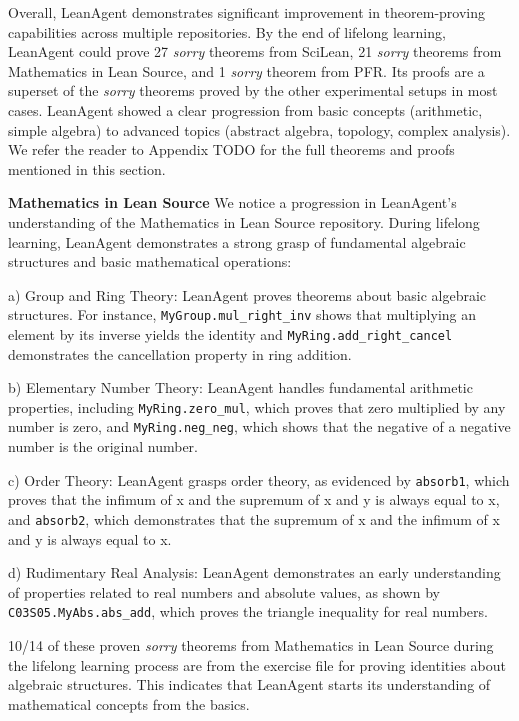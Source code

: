 \documentclass{article} %
\begin{document}
Overall, LeanAgent demonstrates significant improvement in theorem-proving capabilities across multiple repositories. By the end of lifelong learning, LeanAgent could prove 27 \textit{sorry} theorems from SciLean, 21 \textit{sorry} theorems from Mathematics in Lean Source, and 1 \textit{sorry} theorem from PFR. Its proofs are a superset of the \textit{sorry} theorems proved by the other experimental setups in most cases. LeanAgent showed a clear progression from basic concepts (arithmetic, simple algebra) to advanced topics (abstract algebra, topology, complex analysis). We refer the reader to Appendix TODO for the full theorems and proofs mentioned in this section.



\textbf{Mathematics in Lean Source} We notice a progression in LeanAgent's understanding of the Mathematics in Lean Source repository. During lifelong learning, LeanAgent demonstrates a strong grasp of fundamental algebraic structures and basic mathematical operations:

a) Group and Ring Theory:
LeanAgent proves theorems about basic algebraic structures. For instance, \texttt{MyGroup.mul\_right\_inv} shows that multiplying an element by its inverse yields the identity and \texttt{MyRing.add\_right\_cancel} demonstrates the cancellation property in ring addition.


b) Elementary Number Theory:
LeanAgent handles fundamental arithmetic properties, including \texttt{MyRing.zero\_mul}, which proves that zero multiplied by any number is zero, and \texttt{MyRing.neg\_neg}, which shows that the negative of a negative number is the original number.

c) Order Theory:
LeanAgent grasps order theory, as evidenced by \texttt{absorb1}, which proves that the infimum of x and the supremum of x and y is always equal to x, and \texttt{absorb2}, which demonstrates that the supremum of x and the infimum of x and y is always equal to x.

d) Rudimentary Real Analysis:
LeanAgent demonstrates an early understanding of properties related to real numbers and absolute values, as shown by \texttt{C03S05.MyAbs.abs\_add}, which proves the triangle inequality for real numbers.

10/14 of these proven \textit{sorry} theorems from Mathematics in Lean Source during the lifelong learning process are from the exercise file for proving identities about algebraic structures. This indicates that LeanAgent starts its understanding of mathematical concepts from the basics.
\end{document}
